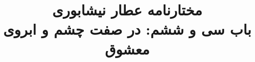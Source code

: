 \documentclass[14pt,b5paper]{article}
\begin{document}
\title{\Huge مختارنامه عطار نیشابوری \\
باب سی و ششم: در صفت چشم و ابروی معشوق}
\author{ }
\date{ }
\maketitle
\newpage
\tableofcontents
\newpage

\newpage

\newpage

\newpage

\newpage

\newpage

\newpage

\newpage

\newpage

\newpage

\newpage

\newpage

\newpage

\newpage

\newpage

\newpage

\newpage

\newpage

\newpage

\newpage

\newpage
\end{document}

